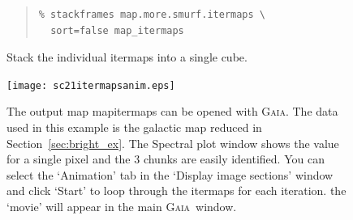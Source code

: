 \documentclass[twoside,11pt]{article}
\newenvironment{latexonly}{}{}
\newcommand{\xref}[3]{#1}
\renewcommand{\_}{\texttt{\symbol{95}}}
\newenvironment{fmpage}[1]{\begin{lrbox}{\fmbox}\begin{minipage}{#1}}{\end{minipage}\end{lrbox}\fbox{\usebox{\fmbox}}}
\newenvironment{myquote}{\begin{quote}\begin{small}}{\end{small}\end{quote}}
\newcommand{\gaia}{\xref{\textsc{Gaia}}{sun214}{}}
\begin{document}
\begin{latexonly}
\begin{figure}[ht!]
\begin{center}
\begin{fmpage}{0.95\linewidth}
\begin{minipage}[c]{0.65\linewidth}
\begin{myquote}
\begin{verbatim}
% stackframes map.more.smurf.itermaps \
  sort=false map_itermaps
\end{verbatim}
\end{myquote}
\end{minipage}
\hspace{0.3cm}
\begin{minipage}[c]{0.29\linewidth}
Stack the individual itermaps into a single cube.
\end{minipage}

\vspace{0.5cm}

\begin{minipage}[c]{0.65\linewidth}
\centering
\texttt{[image: sc21\_itermaps\_anim.eps]}

\end{minipage}
\hspace{0.3cm}
\begin{minipage}[c]{0.29\linewidth}
The output map map\_itermaps can be opened with \gaia. The data used
in this example is the galactic map reduced in
Section~\ref{sec:bright_ex}. The Spectral plot window shows the value
for a single pixel and the 3 chunks are easily identified. You can
select the `Animation' tab in the `Display image sections' window and
click `Start' to loop through the itermaps for each iteration. the
`movie' will appear in the main \gaia\ window.
\end{minipage}

\vspace{0.7cm}


\end{fmpage}
\end{center}
\end{figure}
\end{latexonly}
\end{document}
